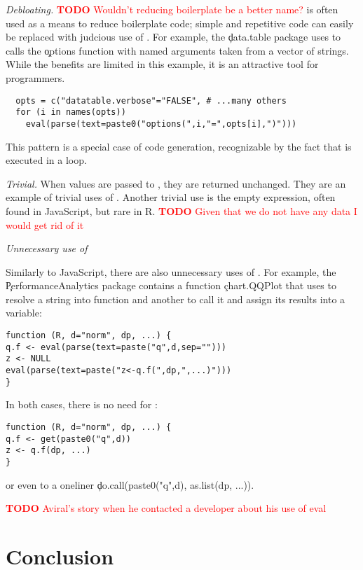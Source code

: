 \documentclass[screen,acmsmall]{acmart}
\newcommand{\mypara}[1]{\medskip\noindent\emph{#1}\xspace}
\newcommand{\authorcomment}[3]{\xspace\textcolor{#1}{{\bf #2} #3}\xspace}
\newcommand{\todo}[1]{\authorcomment{red}{TODO}{#1}}
\begin{document}
\mypara{Debloating.} \todo{Wouldn't reducing boilerplate be a better name?} \Eval is often used as a means to reduce boilerplate code;
simple and repetitive code can easily be replaced with judcious use of \eval.
For example, the \c{data.table} package uses \eval to calls the \c{options}
function with named arguments taken from a vector of strings. While the benefits
are limited in this example, it is an attractive tool for programmers.
\begin{lstlisting}
  opts = c("datatable.verbose"="FALSE", # ...many others
  for (i in names(opts))
    eval(parse(text=paste0("options(",i,"=",opts[i],")")))
\end{lstlisting}
This pattern is a special case of code generation, recognizable by the
fact that \eval is executed in a loop.

\mypara{Trivial.} When values are passed to \eval, they are returned
unchanged. They are an example of trivial uses of \eval. Another
trivial use is the empty expression, often found in JavaScript, but
rare in R. \todo{Given that we do not have any data I would get rid of it}

\mypara{Unnecessary use of \eval}

Similarly to JavaScript, there are also unnecessary uses of \eval. For example,
the \c{PerformanceAnalytics} package contains a function \c{chart.QQPlot} that
uses \eval to resolve a string into function and another to call it and assign
its results into a variable:
\begin{lstlisting}
function (R, d="norm", dp, ...) {
q.f <- eval(parse(text=paste("q",d,sep="")))
z <- NULL
eval(parse(text=paste("z<-q.f(",dp,",...)")))
}
\end{lstlisting}
  In both cases, there is no need for \eval:
\begin{lstlisting}
function (R, d="norm", dp, ...) {
q.f <- get(paste0("q",d))
z <- q.f(dp, ...)
}
\end{lstlisting}
or even to a oneliner \c{do.call(paste0("q",d), as.list(dp, ...))}.

\todo{Aviral's story when he contacted a developer about his use of eval}

\section{Conclusion}


\end{document}
